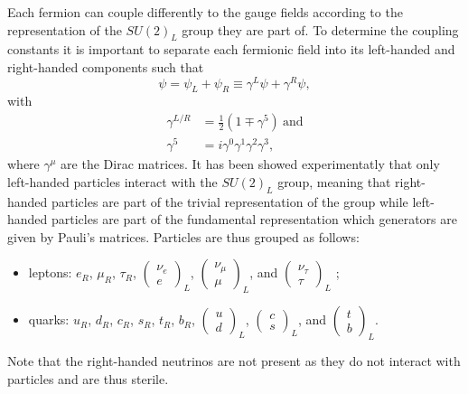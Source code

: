     Each fermion can couple differently to the gauge fields according to the representation of the $ SU(2)_L $ group they are part of. To determine the coupling constants it is important to separate each fermionic field into its left-handed and right-handed components such that
    \begin{equation}
      \psi = \psi_L + \psi_R \equiv \gamma^L \psi + \gamma^R \psi ,
    \end{equation}
    with
    \begin{align}
      \gamma^{L/R} & = \frac{1}{2} \left( 1 \mp \gamma^5 \right) \ \text{and} \\
      \gamma^5 & = i \gamma^0 \gamma^1 \gamma^2 \gamma^3 ,
    \end{align}
    where $ \gamma^\mu $ are the Dirac matrices. It has been showed experimentatly that only left-handed particles interact with the $ SU(2)_L $ group, meaning that right-handed particles are part of the trivial representation of the group while left-handed particles are part of the fundamental representation which generators are given by Pauli's matrices. Particles are thus grouped as follows:
    \begin{itemize}
      \item leptons: $ e_R $, $ \mu_R $, $ \tau_R $, $ \left( \begin{matrix} \nu_e \\ e \end{matrix} \right)_L $, $ \left( \begin{matrix} \nu_\mu \\ \mu \end{matrix} \right)_L $, and $ \left( \begin{matrix} \nu_\tau \\ \tau \end{matrix} \right)_L $ ;
      \item quarks: $ u_R $, $ d_R $, $ c_R $, $ s_R $, $ t_R $, $ b_R $, $ \left( \begin{matrix} u \\ d \end{matrix} \right)_L $, $ \left( \begin{matrix} c \\ s \end{matrix} \right)_L $, and $ \left( \begin{matrix} t \\ b \end{matrix} \right)_L $.
    \end{itemize}
    Note that the right-handed neutrinos are not present as they do not interact with particles and are thus sterile. \\

